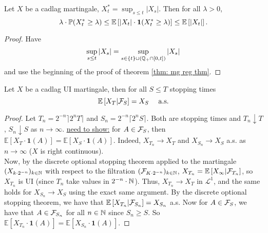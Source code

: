 \documentclass{article}
\begin{document}
\begin{theorem}\label{thm: doob maximal ineq cont time}
Let $ X$ be a cadlag martingale, $ X^{*}_{t} = \displaystyle\sup_{s\leq t}|X_{s}|$. Then for all $ \lambda>0$, 
\[
\lambda\cdot \mathbb{P}(X^{*}_{t}\geq \lambda)\leq \mathbb{E}\left[ |X_{t}|\cdot \mathbf{1}(X^{*}_{t}\geq \lambda) \right] \leq \mathbb{E}\left[ |X_{t}| \right].
\]

\end{theorem}

\begin{proof}
    Have 
    \[
	    \displaystyle\sup_{s\leq t}|X_{s}| = \displaystyle\sup_{s\in \{t\}\cup(\mathbb{Q}_{+}\cap[0,t])}|X_{s}|
    \]
    and use the beginning of the proof of theorem \ref{thm: mg reg thm}.
\end{proof}


\begin{theorem}\label{thm: ost for UI }
Let $ X$ be a cadlag UI martingale, then for all $ S\leq T$ stopping times 
\[
	\mathbb{E}\left[  X_{T}|\mathcal{F}_{S} \right] = X_{S} \quad \text{ a.s.}
\]
\end{theorem}


\begin{proof}
	Let $ T_{n} = 2^{-n}\rceil 2^nT\rceil$ and $ S_{n} = 2^{-n}\lceil 2^n S\rceil$. Both are stopping times and $ T_{n}\downarrow T$, $S_{n}\downarrow S $ as $ n\to \infty$. \underline{need to show:} for $ A\in \mathcal{F}_{S}$, then $ \mathbb{E}\left[ X_{T}\cdot \mathbf{1}(A) \right] = \mathbb{E}\left[ X_{S}\cdot \mathbf{1}(A) \right]$. Indeed, $ X_{T_{n}}\to X_{T}$ and $ X_{S_{n}}\to X_{S}$ a.s. as $ n\to \infty$ ($ X$ is right continuous).\\ 

	Now, by the discrete optional stopping theorem applied to the martingale $ (X_{k\cdot 2^{-n}})_{k\in \mathbb{N}}$ with respect to the filtration $ (\mathcal{F}_{K\cdot 2^{-n}})_{k\in \mathbb{N}}$, $ X_{T_{n}}= \mathbb{E}\left[ X_{\infty}|\mathcal{F}_{T_{n}} \right]$, so $ X_{T_{n}}$ is UI  (since $ T_{n}$ take values in $ 2^{-n}\cdot \mathbb{N}$). Thus, $ X_{T_{n}}\to X_{T}$ in $ \mathcal{L}^{1} $, and the same holds for $ X_{S_{n}}\to X_{S}$ using the exact same argument. By the discrete optional stopping theorem, we have that $ \mathbb{E}\left[ X_{T_{n}}|\mathcal{F}_{S_{n}} \right] = X_{S_{n}}$ a.s. Now for $ A\in \mathcal{F}_{S}$, we have that $ A\in \mathcal{F}_{S_{n}}$ for all $ n\in \mathbb{N}$ since $ S_{n}\geq S$. So $ \mathbb{E}\left[ X_{T_{n}}\cdot \mathbf{1}(A) \right] = \mathbb{E}\left[ X_{S_{n}}\cdot \mathbf{1}(A) \right]$.
\end{proof}
\end{document}
